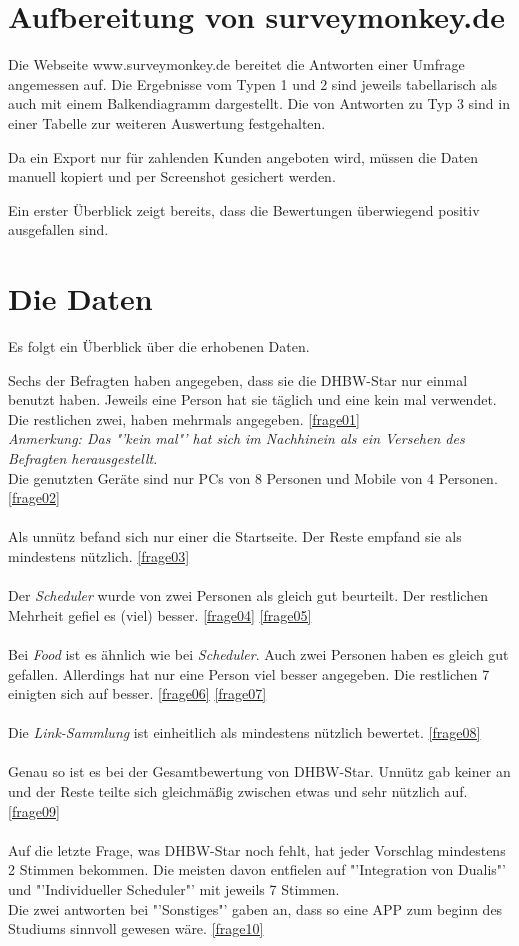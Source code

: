 \section{Aufbereitung von surveymonkey.de}
Die Webseite www.surveymonkey.de bereitet die Antworten einer Umfrage angemessen auf. Die Ergebnisse vom Typen 1 und 2 sind jeweils tabellarisch als auch mit einem Balkendiagramm dargestellt.
Die von Antworten zu Typ 3 sind in einer Tabelle zur weiteren Auswertung festgehalten.

Da ein Export nur für zahlenden Kunden angeboten wird, müssen die Daten manuell kopiert und per Screenshot gesichert werden.

Ein erster Überblick zeigt bereits, dass die Bewertungen überwiegend positiv ausgefallen sind.
\newpage
\section{Die Daten }
Es folgt ein Überblick über die erhobenen Daten.

Sechs der Befragten haben angegeben, dass sie die DHBW-Star nur einmal benutzt haben.
Jeweils eine Person hat sie täglich und eine kein mal verwendet.
Die restlichen zwei, haben mehrmals angegeben. \ref{frage01}\\
\emph{Anmerkung: Das "'kein mal"' hat sich im Nachhinein als ein Versehen des Befragten herausgestellt. }
\\
Die genutzten Geräte sind nur PCs von 8 Personen und Mobile von 4 Personen. \ref{frage02}\\
\\
Als unnütz befand sich nur einer die Startseite. Der Reste empfand sie als mindestens nützlich. \ref{frage03}\\
\\
Der \emph{Scheduler} wurde von zwei Personen als gleich gut beurteilt. Der restlichen Mehrheit gefiel es (viel) besser. \ref{frage04} \ref{frage05}\\
\\
Bei \emph{Food} ist es ähnlich wie bei \emph{Scheduler}. Auch zwei Personen haben es gleich gut gefallen. Allerdings hat nur eine Person viel besser angegeben. Die restlichen 7 einigten sich auf besser. \ref{frage06} \ref{frage07} \\
\\
Die \emph{Link-Sammlung} ist einheitlich als mindestens nützlich bewertet. \ref{frage08} \\
\\
Genau so ist es bei der Gesamtbewertung von DHBW-Star. Unnütz gab keiner an und der Reste teilte sich gleichmäßig zwischen etwas und sehr nützlich auf. \ref{frage09} \\
\\
Auf die letzte Frage, was DHBW-Star noch fehlt, hat jeder Vorschlag mindestens 2 Stimmen bekommen. Die meisten davon entfielen auf "'Integration von Dualis"' und "'Individueller Scheduler"' mit jeweils 7 Stimmen.\\
Die zwei antworten bei "'Sonstiges"' gaben an, dass so eine APP zum beginn des Studiums sinnvoll gewesen wäre. \ref{frage10}
\newpage
